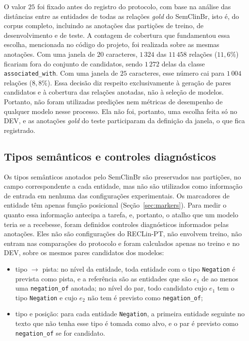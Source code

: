 O valor $25$ foi fixado antes do registro do protocolo, com base na análise das
distâncias entre as entidades de todas as relações \emph{gold} do SemClinBr, isto é,
do corpus completo, incluindo as anotações das partições de treino, de
desenvolvimento e de teste. A contagem de cobertura que fundamentou essa escolha, mencionada no código do projeto, foi realizada sobre as mesmas anotações. Com uma janela de $20$ caracteres, $1\,324$ das $11\,458$ relações ($11{,}6\%$) ficariam fora do conjunto de candidatos, sendo $1\,272$ delas da classe \texttt{associated\_with}. Com uma janela de $25$ caracteres, esse número cai para $1\,004$ relações ($8{,}8\%$). Essa decisão diz respeito exclusivamente à geração de pares candidatos e à cobertura das relações anotadas, não à seleção de modelos. Portanto, não foram utilizadas predições nem métricas de desempenho de qualquer modelo nesse processo. Ela não foi, portanto, uma escolha feita
só no DEV, e as anotações \emph{gold} do teste participaram da definição da janela,
o que fica registrado.

\subsection{Tipos semânticos e controles diagnósticos}
\label{sec:controles_tipo}

Os tipos semânticos anotados pelo SemClinBr são preservados nas partições, no campo correspondente a cada entidade, mas não são utilizados como informação de entrada em nenhuma das configurações experimentais. Os marcadores de entidade têm apenas função posicional (Seção~\ref{sec:markers}). Para medir o quanto essa informação antecipa a tarefa, e,
portanto, o atalho que um modelo teria se a recebesse, foram definidos controles
diagnósticos informados pelas anotações. Eles não são configurações do RECLin-PT,
não envolvem treino, não entram nas comparações do protocolo e foram calculados
apenas no treino e no DEV, sobre os mesmos pares candidatos dos modelos:

\begin{itemize}
  \item tipo $\rightarrow$ pista: no nível da entidade, toda entidade com o tipo
        \texttt{Negation} é prevista como pista, e a referência são as entidades que
        são $e_1$ de ao menos uma \texttt{negation\_of} anotada; no nível do par,
        todo candidato cujo $e_1$ tem o tipo \texttt{Negation} e cujo $e_2$ não tem
        é previsto como \texttt{negation\_of};
  \item tipo e posição: para cada entidade \texttt{Negation}, a primeira entidade
        seguinte no texto que não tenha esse tipo é tomada como alvo, e o par é
        previsto como \texttt{negation\_of} se for candidato.
\end{itemize}

